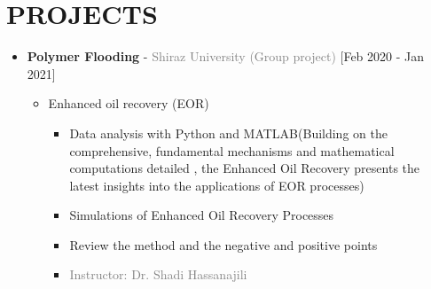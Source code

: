 \documentclass[10pt,a4paper,sans]{moderncv} %
\begin{document}
	\vspace{-1.8em}
	
	\section{PROJECTS}
	\begin{itemize}
		\item {}  \textbf{Polymer Flooding} - \textcolor{gray}{Shiraz University}    \hfill\textcolor{gray}{(Group project)}   [Feb 2020 - Jan 2021]
		\begin{itemize}
			\item Enhanced oil recovery (EOR) 
			\begin{itemize} 
		     	\item Data analysis with Python and MATLAB(Building on the comprehensive, fundamental mechanisms and mathematical computations detailed , the Enhanced Oil Recovery presents the latest insights into the applications of EOR processes)
		     	\item Simulations of Enhanced Oil Recovery Processes
				\item Review the method and the negative and positive points
				
			    
				\item\textcolor{gray}{Instructor: Dr. Shadi Hassanajili}
			\end{itemize}
			
				\newline
			
		\end{itemize}
	\end{itemize}
	
	\vspace{2em}
	
\end{document}
